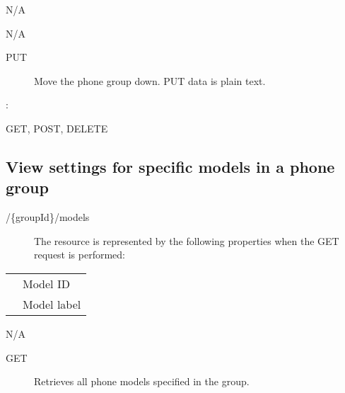 \documentclass[letterpaper,10pt,english]{sphinxmanual}
\begin{document}
 N/A

 N/A
\begin{description}
\item[{ PUT}] \leavevmode
Move the phone group down. PUT data is plain text.

\end{description}

:

\begin{sphinxVerbatim}[commandchars=\\\{\}]
\end{sphinxVerbatim}

 GET, POST, DELETE


\subsection{View settings for specific models in a phone group}
\label{\detokenize{restapi:view-settings-for-specific-models-in-a-phone-group}}
 /\{groupId\}/models
\begin{description}
\item[{}] \leavevmode
The resource is represented by the following properties when the GET request is performed:

\end{description}


\begin{savenotes}\sphinxattablestart
\centering
\begin{tabulary}{\linewidth}[t]{|T|T|}
\hline

&
\\
\hline
{}
&
Model ID
\\
\hline
{}
&
Model label
\\
\hline
\end{tabulary}
\par
\sphinxattableend\end{savenotes}

 N/A
\begin{description}
\item[{ GET}] \leavevmode
Retrieves all phone models specified in the group.

\end{description}
\end{document}
